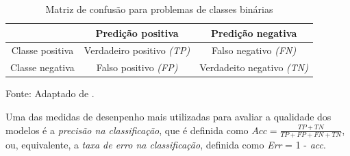 \documentclass[
	12pt,				%
	openright,			%
	oneside,	
	a4paper,				%
	english,				%
	brazil				%
]{abntex2/abntex2} %
\begin{document}
		\begin{table}[htbp]
			\centering
			\caption{Matriz de confusão para problemas de classes binárias}
			\label{tabMatrizConfusao}
			\begin{center}
				\renewcommand{\arraystretch}{2}
				\begin{tabular}{ccc}
					\hline
					               & \textbf{Predição positiva}               & \textbf{Predição negativa}         \\ \hline
					\multicolumn{1}{c|}{Classe positiva}                                      & Verdadeiro positivo \textit{(TP)}                                                                                 & Falso negativo \textit{(FN)} 							                                                                                    
					\\
					\multicolumn{1}{c|}{Classe negativa}                                      & Falso positivo \textit{(FP)}                                                                                  &Verdadeito negativo \textit{(TN)} 							                                                                                   							            
					\\ 
					\hline
				\end{tabular}
			\end{center}
			{\fontsize{10}{\baselineskip} \selectfont Fonte: Adaptado de \cite{prati:2008}.}
		\end{table}
		

		Uma das medidas de desenpenho  mais utilizadas para avaliar a qualidade dos modelos é a \textit{precisão na classificação}, que é definida como $Acc = \frac{TP + TN}{TP + FP + FN + TN} $, ou, equivalente, a \textit{taxa de erro na classificação}, definida como \textit{Err} = 1 - \textit{acc}.
	
		

\end{document}
